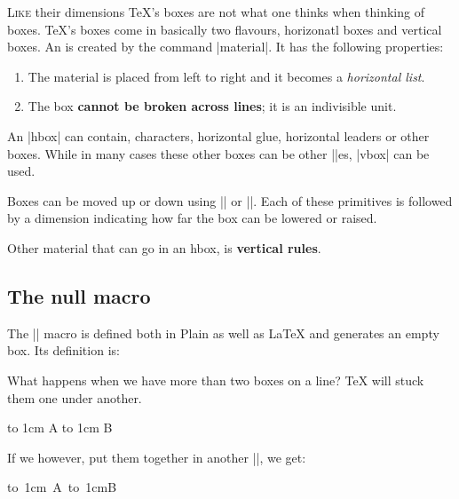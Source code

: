 \begin{multicols}{2}
\noindent \lettrine{L}{ike} their dimensions \TeX's boxes are not what one thinks when thinking of boxes. TeX's boxes come in basically two flavours, horizonatl boxes and vertical boxes. An  is created by the command |\hbox{material}|. It has the following properties:

\begin{enumerate}[1.]
\item The material is placed from left to right and it becomes a \textit{horizontal list}.
\item The box \textbf{cannot be broken across lines}; it is an indivisible unit.
\end{enumerate}

An |hbox| can contain, characters, horizontal glue, horizontal leaders or other boxes. While in many cases these other boxes can be other |\hbox|es, |vbox| can be used.

Boxes can be moved up or down using |\raise| or |\lower|. Each of these primitives is followed by a dimension indicating how far the box can be lowered or raised.

Other material that can go in an hbox, is \textbf{vertical rules}. 

\subsection{The null macro}

The |\null| macro is defined both in Plain as well as LaTeX and generates an empty box. Its definition is:

\begin{teXXX}
\def\null{\hbox{}}
\end{teXXX}



{


}

What happens when we have more than two boxes on a line? TeX will stuck them one under another.

\hbox to 1cm {A} \hbox to 1cm {B}

If we however, put them together in another |\hbox|, we get:

\hbox{\hbox to 1cm {A} \hbox to 1cm{B}}



\end{multicols}

